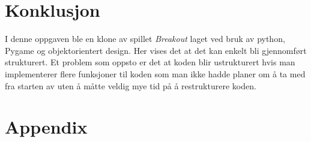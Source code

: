 \documentclass{article}     %
\begin{document}
\section{Konklusjon}

I denne oppgaven ble en klone av spillet \emph{Breakout} laget ved bruk av python, Pygame og objektorientert design. Her vises det at det kan enkelt bli gjennomført strukturert. Et problem som oppsto er det at koden blir ustrukturert hvis man implementerer flere funksjoner til koden som man ikke hadde planer om å ta med fra starten av uten å måtte veldig mye tid på å restrukturere koden.










\newpage
\appendix

\section{Appendix}
















\end{document}
